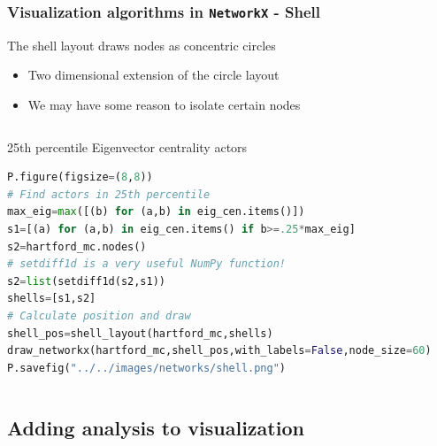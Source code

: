 \documentclass[xcolor=dvipsnames, 9pt]{beamer}
\begin{document}
\begin{frame}[fragile]
    \frametitle{Visualization algorithms in \texttt{NetworkX} - Shell}
    The shell layout draws nodes as concentric circles
    \begin{itemize}
        \item Two dimensional extension of the circle layout
        \item We may have some reason to isolate certain nodes
    \end{itemize}
    \begin{columns}
            \begin{block}{25th percentile Eigenvector centrality actors}
                \scriptsize{\begin{lstlisting}[language=Python]
P.figure(figsize=(8,8))
# Find actors in 25th percentile
max_eig=max([(b) for (a,b) in eig_cen.items()])
s1=[(a) for (a,b) in eig_cen.items() if b>=.25*max_eig]
s2=hartford_mc.nodes()
# setdiff1d is a very useful NumPy function!
s2=list(setdiff1d(s2,s1))       
shells=[s1,s2]
# Calculate position and draw          
shell_pos=shell_layout(hartford_mc,shells)
draw_networkx(hartford_mc,shell_pos,with_labels=False,node_size=60)
P.savefig("../../images/networks/shell.png")
                \end{lstlisting}}
            \end{block}
    \end{columns}
    \vspace{2mm}
\end{frame}


\subsection{Adding analysis to visualization} %
\label{sub:adding_analysis_to_visualization}
\end{document}
